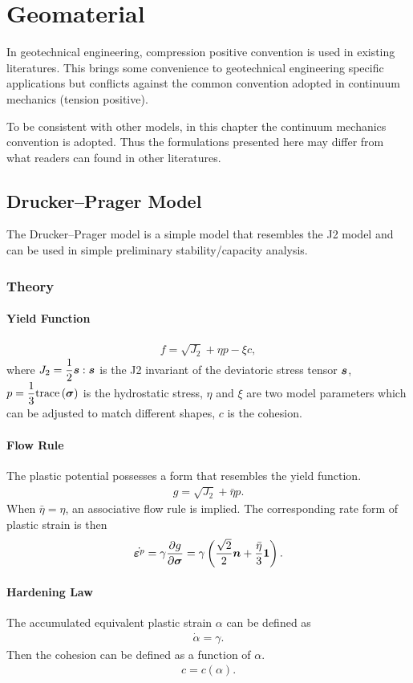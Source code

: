 \chapter{Geomaterial}
In geotechnical engineering, compression positive convention is used in existing literatures. This brings some convenience to geotechnical engineering specific applications but conflicts against the common convention adopted in continuum mechanics (tension positive).

To be consistent with other models, in this chapter the continuum mechanics convention is adopted. Thus the formulations presented here may differ from what readers can found in other literatures.
\section{Drucker--Prager Model}
The Drucker--Prager model is a simple model that resembles the J2 model and can be used in simple preliminary stability/capacity analysis.
\subsection{Theory}
\subsubsection{Yield Function}
\begin{gather}
f=\sqrt{J_2}+\eta{}p-\xi{}c,
\end{gather}
where $J_2=\dfrac{1}{2}\bm{s}:\bm{s}$ is the J2 invariant of the deviatoric stress tensor $\bm{s}$, $p=\dfrac{1}{3}\text{trace}\left(\bm{\sigma}\right)$ is the hydrostatic stress, $\eta$ and $\xi$ are two model parameters which can be adjusted to match different shapes, $c$ is the cohesion.
\subsubsection{Flow Rule}
The plastic potential possesses a form that resembles the yield function.
\begin{gather}
g=\sqrt{J_2}+\bar{\eta}p.
\end{gather}
When $\bar{\eta}=\eta$, an associative flow rule is implied. The corresponding rate form of plastic strain is then
\begin{gather}
\dot{\bm{\varepsilon}^p}=\gamma\dfrac{\partial{g}}{\partial{\bm{\sigma}}}=\gamma\left(\dfrac{\sqrt{2}}{2}\bm{n}+\dfrac{\bar{\eta}}{3}\bm{1}\right).
\end{gather}
\subsubsection{Hardening Law}
The accumulated equivalent plastic strain $\alpha$ can be defined as
\begin{gather}
\dot{\alpha}=\gamma.
\end{gather}
Then the cohesion can be defined as a function of $\alpha$.
\begin{gather}
c=c\left(\alpha\right).
\end{gather}

